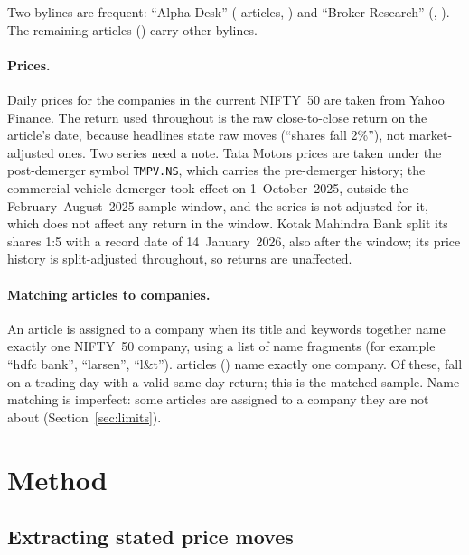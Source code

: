 \documentclass[11pt]{article}
\begin{document}
Two bylines are frequent: ``Alpha Desk'' (\nAlphaDesk{} articles, \shareAlphaDesk{}) and ``Broker Research'' (\nBrokerResearch{}, \shareBrokerResearch{}). The remaining \nOtherAuthors{} articles (\shareOtherAuthors{}) carry other bylines.

\paragraph{Prices.} Daily prices for the \nTickers{} companies in the current NIFTY~50 are taken from Yahoo Finance. The return used throughout is the raw close-to-close return on the article's date, because headlines state raw moves (``shares fall 2\%''), not market-adjusted ones. Two series need a note. Tata Motors prices are taken under the post-demerger symbol \texttt{TMPV.NS}, which carries the pre-demerger history; the commercial-vehicle demerger took effect on 1~October~2025, outside the February--August~2025 sample window, and the series is not adjusted for it, which does not affect any return in the window. Kotak Mahindra Bank split its shares 1:5 with a record date of 14~January~2026, also after the window; its price history is split-adjusted throughout, so returns are unaffected.

\paragraph{Matching articles to companies.} An article is assigned to a company when its title and keywords together name exactly one NIFTY~50 company, using a list of name fragments (for example ``hdfc bank'', ``larsen'', ``l\&t''). \nSingleName{} articles (\shareSingleName{}) name exactly one company. Of these, \nMatched{} fall on a trading day with a valid same-day return; this is the matched sample. Name matching is imperfect: some articles are assigned to a company they are not about (Section~\ref{sec:limits}).

\section{Method}

\subsection{Extracting stated price moves}
\end{document}
